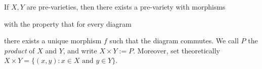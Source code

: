 \begin{prop}
  If $X, Y$ are pre-varieties, then
  there exists a pre-variety with morphisms
  \begin{center}
  \end{center}
  with the property that for every diagram
  \begin{center}
  \end{center}
  there exists a unique morphism
  $f$ such that the diagram commutes.
  We call $P$ the \emph{product} of
  $X$ and $Y$, and write
  $X \times Y := P$. Moreover,
  set theoretically
  $X \times Y = \{(x, y) : x \in X \text{ and } y \in Y\}$.
\end{prop}

